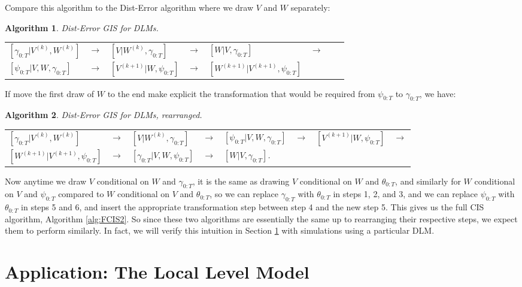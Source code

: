 \documentclass{article}
\newtheorem{alg}{Algorithm}
\begin{document}
Compare this algorithm to the Dist-Error algorithm where we draw $V$ and $W$ separately:
\begin{alg}Dist-Error GIS for DLMs.\label{alg:Dist-Error}\\
  \begin{center}
    \begin{tabular}{llllllll}
      $[\gamma_{0:T}|V^{(k)},W^{(k)}]$& $\to $& $[V|W^{(k)},\gamma_{0:T}]$& $\to$& $[W|V,\gamma_{0:T}]$& $\to$\\
      $[\psi_{0:T}|V,W,\gamma_{0:T}]$& $\to$& $[V^{(k+1)}|W,\psi_{0:T}]$& $\to$& $[W^{(k+1)}|V^{(k+1)},\psi_{0:T}]$&
    \end{tabular}
  \end{center}
\end{alg}
If move the first draw of $W$ to the end make explicit the transformation that would be required from $\psi_{0:T}$ to $\gamma_{0:T}$, we have:
\begin{alg}Dist-Error GIS for DLMs, rearranged.\label{alg:Dist-Error2}\\
  \begin{center}
    \begin{tabular}{llllllll}
      $[\gamma_{0:T}|V^{(k)},W^{(k)}]$& $\to $& $[V|W^{(k)},\gamma_{0:T}]$& $\to$& $[\psi_{0:T}|V,W,\gamma_{0:T}]$& $\to$& $[V^{(k+1)}|W,\psi_{0:T}]$& $\to$\\
      $[W^{(k+1)}|V^{(k+1)},\psi_{0:T}]$& $\to$& $[\gamma_{0:T}|V,W,\psi_{0:T}]$&$\to$& $[W|V,\gamma_{0:T}]$.&&&
    \end{tabular}
  \end{center}
\end{alg}
Now anytime we draw $V$ conditional on $W$ and $\gamma_{0:T}$, it is the same as drawing $V$ conditional on $W$ and $\theta_{0:T}$, and similarly for $W$ conditional on $V$ and $\psi_{0:T}$ compared to $W$ conditional on $V$ and $\theta_{0:T}$, so we can replace $\gamma_{0:T}$ with $\theta_{0:T}$ in steps 1, 2, and 3, and we can replace $\psi_{0:T}$ with $\theta_{0:T}$ in steps 5 and 6, and insert the appropriate transformation step between step 4 and the new step 5. This gives us the full CIS algorithm, Algorithm \ref{alg:FCIS2}. So since these two algorithms are essentially the same up to rearranging their respective steps, we expect them to perform similarly. In fact, we will verify this intuition in Section \ref{sec:LLMest} with simulations using a particular DLM.

\section{Application: The Local Level Model}\label{sec:LLMest}
\end{document}
